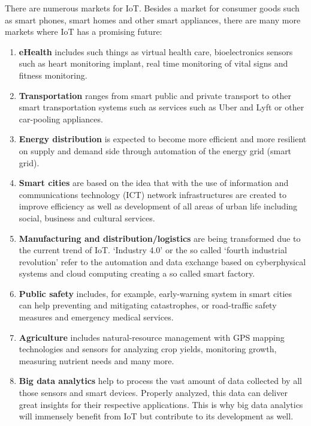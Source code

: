 		There are numerous markets for IoT. Besides a market for consumer goods such as smart phones, smart homes and other smart appliances, there are many more markets where IoT has a promising future:

		\begin{enumerate}
			\item \textbf{eHealth} includes such things as virtual health care, bioelectronics sensors such as heart monitoring implant, real time monitoring of vital signs and fitness monitoring. 

			\item \textbf{Transportation} ranges from smart public and private transport to other smart transportation systems such as services such as Uber and Lyft or other car-pooling appliances. 

			\item \textbf{Energy distribution} is expected to become more efficient and more resilient on supply and demand side through automation of the energy grid (smart grid).

			\item \textbf{Smart cities} are based on the idea that with the use of information and communications technology (ICT) network infrastructures are created to improve efficiency as well as development of all areas of urban life including social, business and cultural services.

			\item \textbf{Manufacturing and distribution/logistics} are being transformed due to the current trend of IoT. `Industry 4.0' or the so called `fourth industrial revolution' refer to the automation and data exchange based on cyberphysical systems and cloud computing creating a so called smart factory.

			\item \textbf{Public safety} includes, for example, early-warning system in smart cities can help preventing and mitigating catastrophes, or road-traffic safety measures and emergency medical services.

			\item \textbf{Agriculture} includes natural-resource management with GPS mapping technologies and sensors for analyzing crop yields, monitoring growth, measuring nutrient needs and many more. 

			\item \textbf{Big data analytics} help to process the vast amount of data collected by all those sensors and smart devices. Properly analyzed, this data can deliver great insights for their respective applications. This is why big data analytics will immensely benefit from IoT but contribute to its development as well.
		\end{enumerate}
		
